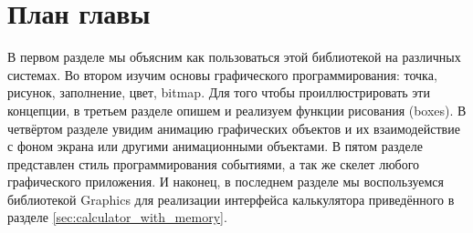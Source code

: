 \section{План главы}
\label{sec:chapter_overview_5}

В первом разделе мы объясним как пользоваться этой библиотекой на различных
системах. Во втором изучим основы графического программирования: точка, рисунок,
заполнение, цвет, bitmap. Для того чтобы проиллюстрировать эти концепции, в
третьем разделе опишем и реализуем функции рисования  (boxes). В
четвёртом разделе увидим анимацию графических объектов и их взаимодействие с
фоном экрана или другими анимационными объектами. В пятом разделе представлен
стиль программирования событиями, а так же скелет любого графического
приложения. И наконец, в последнем разделе мы воспользуемся библиотекой Graphics
для реализации интерфейса калькулятора приведённого в разделе
\ref{sec:calculator_with_memory}.